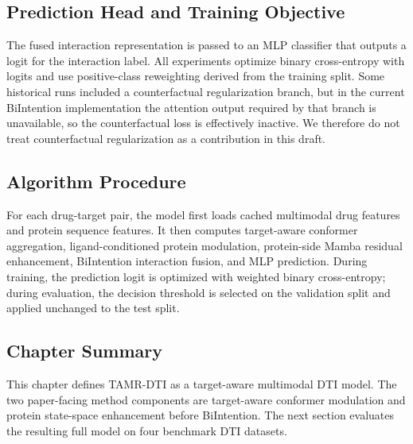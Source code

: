 \subsection{Prediction Head and Training Objective}

The fused interaction representation is passed to an MLP classifier that outputs a logit for the interaction label. All experiments optimize binary cross-entropy with logits and use positive-class reweighting derived from the training split. Some historical runs included a counterfactual regularization branch, but in the current BiIntention implementation the attention output required by that branch is unavailable, so the counterfactual loss is effectively inactive. We therefore do not treat counterfactual regularization as a contribution in this draft.

\subsection{Algorithm Procedure}

For each drug-target pair, the model first loads cached multimodal drug features and protein sequence features. It then computes target-aware conformer aggregation, ligand-conditioned protein modulation, protein-side Mamba residual enhancement, BiIntention interaction fusion, and MLP prediction. During training, the prediction logit is optimized with weighted binary cross-entropy; during evaluation, the decision threshold is selected on the validation split and applied unchanged to the test split.

\subsection{Chapter Summary}

This chapter defines TAMR-DTI as a target-aware multimodal DTI model. The two paper-facing method components are target-aware conformer modulation and protein state-space enhancement before BiIntention. The next section evaluates the resulting full model on four benchmark DTI datasets.
